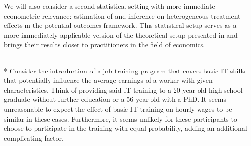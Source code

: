 We will also consider a second statistical setting with more immediate econometric relevance: estimation of and inference on heterogeneous treatment effects in the potential outcomes framework.
This statistical setup serves as a more immediately applicable version of the theoretical setup presented in \citet{ritzwoller_simultaneous_2024} and brings their results closer to practitioners in the field of economics.
\begin{boxE}
    \addtocounter{exmp}{-1}
    \begin{exmp}\mbox{}\\*
        Consider the introduction of a job training program that covers basic IT skills that potentially influence the average earnings of a worker with given characteristics.
        Think of providing said IT training to a 20-year-old high-school graduate without further education or a 56-year-old with a PhD. It seems unreasonable to expect the effect of basic IT training on hourly wages to be similar in these cases.
        Furthermore, it seems unlikely for these participants to choose to participate in the training with equal probability, adding an additional complicating factor.
    \end{exmp}    
\end{boxE}
